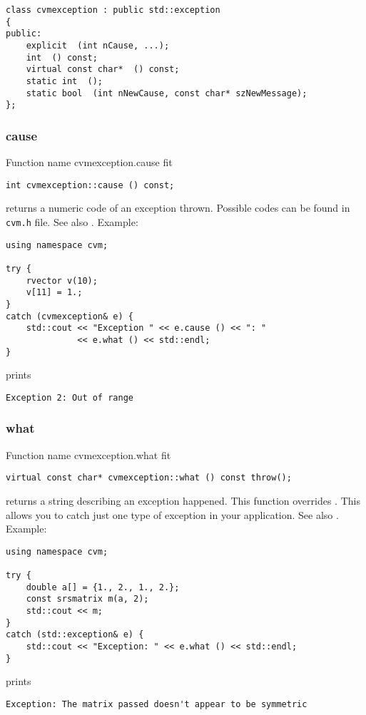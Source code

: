 \bigskip
\noindent
\verb"class cvmexception : public std::exception"\\
\verb"{"\\
\verb"public:"\\
\verb"    explicit "\verb" (int nCause, ...);"\\
\verb"    int "\verb" () const;"\\
\verb"    virtual const char* "\verb" () const;"\\
\verb"    static int "\verb" ();"\\
\verb"    static bool "\verb" (int nNewCause, const char* szNewMessage);"\\
\verb"};"
\newpage



\subsubsection{cause}
Function%
\pdfdest name {cvmexception.cause} fit
\begin{verbatim}
int cvmexception::cause () const;
\end{verbatim}
returns a numeric code of an exception thrown.
Possible codes can be found in \verb"cvm.h" file.
See also .
Example:
\begin{Verbatim}
using namespace cvm;

try {
    rvector v(10);
    v[11] = 1.;
}
catch (cvmexception& e) {
    std::cout << "Exception " << e.cause () << ": " 
              << e.what () << std::endl;
}
\end{Verbatim}
prints
\begin{Verbatim}
Exception 2: Out of range
\end{Verbatim}
\newpage



\subsubsection{what}
Function%
\pdfdest name {cvmexception.what} fit
\begin{verbatim}
virtual const char* cvmexception::what () const throw();
\end{verbatim}
returns a string describing an exception happened.
This function overrides .
This allows you to catch just one type of exception
in your application.
See also .
Example:
\begin{Verbatim}
using namespace cvm;

try {
    double a[] = {1., 2., 1., 2.};
    const srsmatrix m(a, 2);
    std::cout << m;
}
catch (std::exception& e) {
    std::cout << "Exception: " << e.what () << std::endl;
}
\end{Verbatim}
prints
\begin{Verbatim}
Exception: The matrix passed doesn't appear to be symmetric
\end{Verbatim}
\newpage



